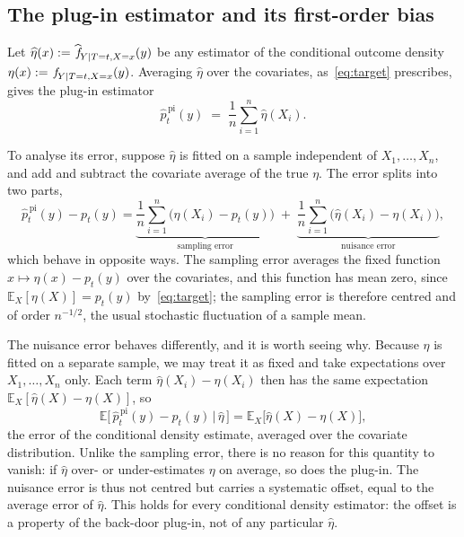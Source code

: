 \documentclass[11pt]{article}
\theoremstyle{plain}
\theoremstyle{definition}
\theoremstyle{remark}
\newcommand{\pE}{\ensuremath{\mathbb{E}}}
\newcommand{\pf}[1]{\ensuremath{\,\mathlarger{\textit{f}}_{#1}}}
\newcommand{\pfhat}[1]{\ensuremath{\,\mathlarger{\widehat{\textit{f}}}_{#1}}}
\begin{document}
\subsection{The plug-in estimator and its first-order bias}
\label{sec:setting-plugin}

Let $\widehat\eta(x) := \pfhat{Y\mid T=t,X=x}(y)$ be any estimator of the conditional
outcome density $\eta(x) := \pf{Y\mid T=t,X=x}(y)$.
Averaging $\widehat\eta$ over the covariates, as~\eqref{eq:target} prescribes, gives the
plug-in estimator
\begin{equation}
\widehat p^{\,\mathrm{pi}}_t(y)
\;=\; \frac{1}{n} \sum_{i=1}^{n} \widehat\eta(X_i).
\label{eq:plugin}
\end{equation}

To analyse its error, suppose $\widehat\eta$ is fitted on a sample independent of
$X_1,\dots,X_n$, and add and subtract the covariate average of the true $\eta$. The error
splits into two parts,
\begin{equation}
\widehat p^{\,\mathrm{pi}}_t(y) - p_t(y)
= \underbrace{\frac1n \sum_{i=1}^n \big( \eta(X_i) - p_t(y) \big)}_{\text{sampling error}}
\;+\; \underbrace{\frac1n \sum_{i=1}^n \big( \widehat\eta(X_i) - \eta(X_i) \big)}_{\text{nuisance error}} ,
\label{eq:plugin-decomp}
\end{equation}
which behave in opposite ways. The sampling error averages the fixed function
$x\mapsto\eta(x)-p_t(y)$ over the covariates, and this function has mean zero, since
$\pE_X[\eta(X)] = p_t(y)$ by~\eqref{eq:target}; the sampling error is therefore centred and
of order $n^{-1/2}$, the usual stochastic fluctuation of a sample mean.

The nuisance error behaves differently, and it is worth seeing why. Because $\widehat\eta$
is fitted on a separate sample, we may treat it as fixed and take expectations over
$X_1,\dots,X_n$ only. Each term $\widehat\eta(X_i)-\eta(X_i)$ then has the same expectation
$\pE_X[\widehat\eta(X)-\eta(X)]$, so
\begin{equation}
\pE\Big[\, \widehat p^{\,\mathrm{pi}}_t(y) - p_t(y) \,\Big|\, \widehat\eta \,\Big]
= \pE_X\big[ \widehat\eta(X) - \eta(X) \big],
\label{eq:plugin-bias}
\end{equation}
the error of the conditional density estimate, averaged over the covariate distribution.
Unlike the sampling error, there is no reason for this quantity to vanish: if $\widehat\eta$
over- or under-estimates $\eta$ on average, so does the plug-in. The nuisance error is thus
not centred but carries a systematic offset, equal to the average error of $\widehat\eta$.
This holds for every conditional density estimator: the offset is a property of the
back-door plug-in, not of any particular $\widehat\eta$.
\end{document}
